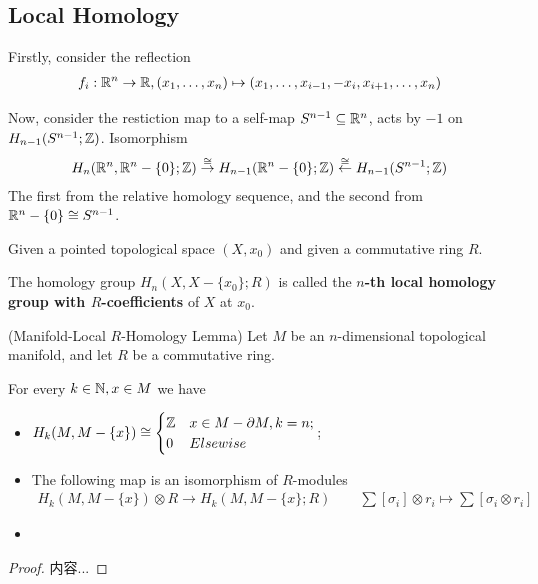 \documentclass[Total.tex]{subfiles}
\begin{document}
				\subsection{Local Homology}
				Firstly, consider the reflection
				\begin{gather*}
					f_i:\mathbb{R}^n\rightarrow \mathbb{R},(x_1,\dots,x_n)\mapsto (x_1,\dots,x_{i-1},-x_i,x_{i+1},\dots,x_n)
				\end{gather*}
				
				Now, consider the restiction map to a self-map $S^{n-1}\subseteq \mathbb{R}^n$, acts by $-1$ on $H_{n-1}(S^{n-1};\mathbb{Z})$. Isomorphism
				\begin{gather*}
					H_n(\mathbb{R}^n,\mathbb{R}^n-\{0\};\mathbb{Z})\stackrel{\cong}{\rightarrow} H_{n-1}(\mathbb{R}^n-\{0\};\mathbb{Z})\stackrel{\cong}{\leftarrow} H_{n-1}(S^{n-1};\mathbb{Z})
				\end{gather*}
				The first from the relative homology sequence, and the second from $\mathbb{R}^n-\{0\}\cong S^{n-1}$. 
				\begin{Def}
					Given a pointed topological space $(X,x_0)$ and given a commutative ring $R$.
					
				 	The homology group $H_n(X,X-\{x_0\};R)$ is called the \textbf{$n$-th local homology group with $R$-coefficients} of $X$ at $x_0$.
				\end{Def}
				
				\begin{lemma}
					(Manifold-Local $R$-Homology Lemma) Let $M$ be an $n$-dimensional topological manifold, and let $R$ be a commutative ring. 
					
					For every $k\in \mathbb{N},x\in M$ we have
					\begin{itemize}
						\item $H_k(M,M-\{x\})\cong \begin{cases}
							\mathbb{Z}&x\in M-\partial M,k=n;\\
							0&Elsewise
						\end{cases}$;
						\item The following map is an isomorphism of $R$-modules
						\begin{gather*}
							H_k(M,M-\{x\})\otimes R\rightarrow H_k(M,M-\{x\};R)\qquad \sum [\sigma_i]\otimes r_i\mapsto \sum [\sigma_i\otimes r_i]
						\end{gather*}
						\item 
					\end{itemize}
				\end{lemma}
				\begin{proof}
					内容...
				\end{proof}
				
\end{document}
